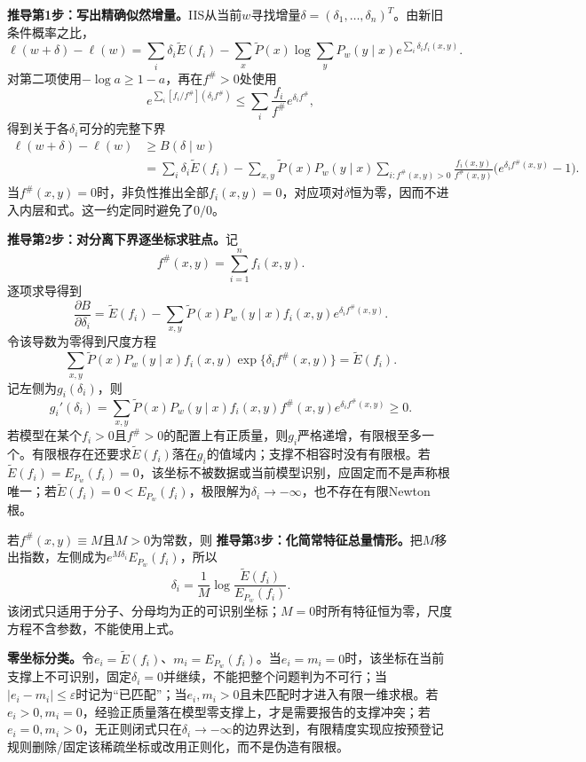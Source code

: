 \textbf{推导第1步：写出精确似然增量。}IIS从当前$w$寻找增量$\delta=(\delta_1,\ldots,\delta_n)^T$。由新旧条件概率之比，
\[
\ell(w+\delta)-\ell(w)
=\sum_i\delta_i\widetilde E(f_i)
-\sum_x\widetilde P(x)\log\sum_yP_w(y\mid x)
e^{\sum_i\delta_i f_i(x,y)}.
\]
对第二项使用$-\log a\geq1-a$，再在$f^\#>0$处使用
\[
e^{\sum_i[f_i/f^\#](\delta_i f^\#)}
\leq\sum_i\frac{f_i}{f^\#}e^{\delta_i f^\#},
\]
得到关于各$\delta_i$可分的完整下界
\[
\begin{aligned}
\ell(w+\delta)-\ell(w)
&\geq B(\delta\mid w)\\
&=\sum_i\delta_i\widetilde E(f_i)
-\sum_{x,y}\widetilde P(x)P_w(y\mid x)
 \sum_{i:f^\#(x,y)>0}\frac{f_i(x,y)}{f^\#(x,y)}
 \bigl(e^{\delta_i f^\#(x,y)}-1\bigr).
\end{aligned}
\]
当$f^\#(x,y)=0$时，非负性推出全部$f_i(x,y)=0$，对应项对$\delta$恒为零，因而不进入内层和式。这一约定同时避免了$0/0$。

\textbf{推导第2步：对分离下界逐坐标求驻点。}记
\[
f^\#(x,y)=\sum_{i=1}^{n}f_i(x,y).
\]
逐项求导得到
\[
\frac{\partial B}{\partial\delta_i}
=\widetilde E(f_i)-
\sum_{x,y}\widetilde P(x)P_w(y\mid x)f_i(x,y)
e^{\delta_i f^\#(x,y)}.
\]
令该导数为零得到尺度方程
\[
\sum_{x,y}\widetilde P(x)P_w(y\mid x)f_i(x,y)
\exp\{\delta_i f^\#(x,y)\}=\widetilde E(f_i).
\]
记左侧为$g_i(\delta_i)$，则
\[
g_i'(\delta_i)=\sum_{x,y}\widetilde P(x)P_w(y\mid x)
f_i(x,y)f^\#(x,y)e^{\delta_i f^\#(x,y)}\geq0.
\]
若模型在某个$f_i>0$且$f^\#>0$的配置上有正质量，则$g_i$严格递增，有限根至多一个。有限根存在还要求$\widetilde E(f_i)$落在$g_i$的值域内；支撑不相容时没有有限根。若$\widetilde E(f_i)=E_{P_w}(f_i)=0$，该坐标不被数据或当前模型识别，应固定而不是声称根唯一；若$\widetilde E(f_i)=0<E_{P_w}(f_i)$，极限解为$\delta_i\to-\infty$，也不存在有限Newton根。

若$f^\#(x,y)\equiv M$且$M>0$为常数，则
\textbf{推导第3步：化简常特征总量情形。}把$M$移出指数，左侧成为$e^{M\delta_i}E_{P_w}(f_i)$，所以
\[
\delta_i=\frac1M\log\frac{\widetilde E(f_i)}{E_{P_w}(f_i)}.
\]
该闭式只适用于分子、分母均为正的可识别坐标；$M=0$时所有特征恒为零，尺度方程不含参数，不能使用上式。

\textbf{零坐标分类。}令$e_i=\widetilde E(f_i)$、$m_i=E_{P_w}(f_i)$。当$e_i=m_i=0$时，该坐标在当前支撑上不可识别，固定$\delta_i=0$并继续，不能把整个问题判为不可行；当$|e_i-m_i|\leq\varepsilon$时记为“已匹配”；当$e_i,m_i>0$且未匹配时才进入有限一维求根。若$e_i>0,m_i=0$，经验正质量落在模型零支撑上，才是需要报告的支撑冲突；若$e_i=0,m_i>0$，无正则闭式只在$\delta_i\to-\infty$的边界达到，有限精度实现应按预登记规则删除/固定该稀疏坐标或改用正则化，而不是伪造有限根。

